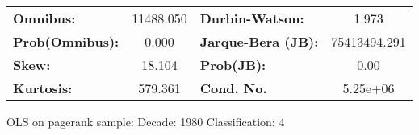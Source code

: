 \begin{center}
\begin{tabular}{lccccc}
\end{tabular}
\begin{tabular}{lclc}
\textbf{Omnibus:}       & 11488.050 & \textbf{  Durbin-Watson:     } &      1.973    \\
\textbf{Prob(Omnibus):} &    0.000  & \textbf{  Jarque-Bera (JB):  } & 75413494.291  \\
\textbf{Skew:}          &   18.104  & \textbf{  Prob(JB):          } &       0.00    \\
\textbf{Kurtosis:}      &  579.361  & \textbf{  Cond. No.          } &   5.25e+06    \\
\bottomrule
\end{tabular}
\end{center}
\break
OLS on pagerank sample: Decade: 1980 Classification: 4
